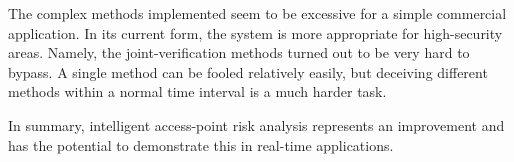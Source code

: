 The complex methods implemented seem to be excessive for a simple commercial application. In its current form, the system is more appropriate for high-security areas. Namely, the joint-verification methods turned out to be very hard to bypass. A single method can be fooled relatively easily, but deceiving different methods within a normal time interval is a much harder task. 

In summary, intelligent access-point risk analysis represents an improvement and has the potential to demonstrate this in real-time applications.


